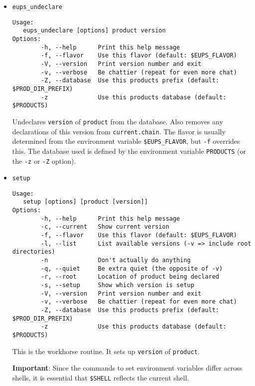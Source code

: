 \documentclass{article}
\begin{document}
\begin{itemize}

  \item \texttt{eups\_undeclare}
\begin{verbatim}
Usage:
   eups_undeclare [options] product version
Options:
        -h, --help      Print this help message
        -f, --flavor    Use this flavor (default: $EUPS_FLAVOR)
        -V, --version   Print version number and exit
        -v, --verbose   Be chattier (repeat for even more chat)
        -Z, --database  Use this products prefix (default: $PROD_DIR_PREFIX)
        -z              Use this products database (default: $PRODUCTS)
\end{verbatim}
  
Undeclares \texttt{version} of \texttt{product} from the
database. Also removes any declarations of this version from
\texttt{current.chain}. The flavor is usually determined from the
environment variable \texttt{\$EUPS\_FLAVOR}, but \texttt{-f}
overrides this. The database used is defined by the environment
variable \texttt{PRODUCTS} (or the \texttt{-z} or \texttt{-Z} option).


\item \texttt{setup}
\begin{verbatim}
Usage:
   setup [options] [product [version]]
Options:
        -h, --help      Print this help message
        -c, --current   Show current version
        -f, --flavor    Use this flavor (default: $EUPS_FLAVOR)
        -l, --list      List available versions (-v => include root directories)
        -n              Don't actually do anything
        -q, --quiet     Be extra quiet (the opposite of -v)
        -r, --root      Location of product being declared
        -s, --setup     Show which version is setup
        -V, --version   Print version number and exit
        -v, --verbose   Be chattier (repeat for even more chat)
        -Z, --database  Use this products prefix (default: $PROD_DIR_PREFIX)
        -z              Use this products database (default: $PRODUCTS)
\end{verbatim}

This is the workhorse routine. It sets up \texttt{version} of \texttt{product}.

\textbf{Important}: Since the commands to set environment variables differ across shells,
it is essential that \texttt{\$SHELL} reflects the current shell.


\end{itemize}
\end{document}
